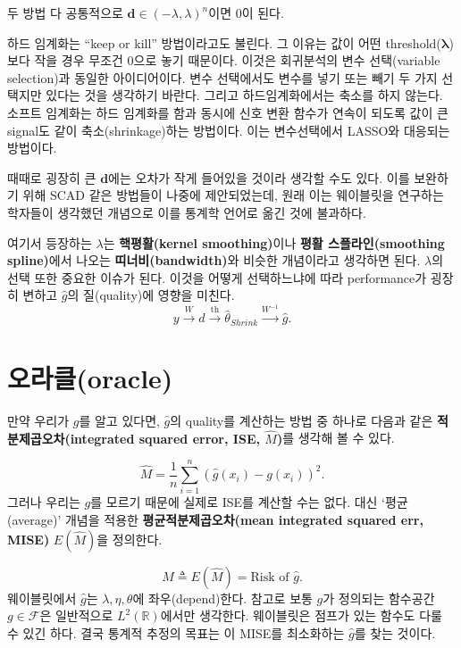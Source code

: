 \documentclass[b5paper,]{scrbook}
\theoremstyle{plain}
\theoremstyle{definition}
\numberwithin{equation}{section}
\begin{document}
두 방법 다 공통적으로 \(\mathbf{d} \in (-\lambda, \lambda)^{n}\)이면 0이 된다.

하드 임계화는 ``keep or kill'' 방법이라고도 불린다. 그 이유는 값이 어떤 threshold(\(\mathbf{\lambda}\))보다 작을 경우 무조건 0으로 놓기 때문이다. 이것은 회귀분석의 변수 선택(variable selection)과 동일한 아이디어이다. 변수 선택에서도 변수를 넣기 또는 빼기 두 가지 선택지만 있다는 것을 생각하기 바란다. 그리고 하드임계화에서는 축소를 하지 않는다. 소프트 임계화는 하드 임계화를 함과 동시에 신호 변환 함수가 연속이 되도록 값이 큰 signal도 같이 축소(shrinkage)하는 방법이다. 이는 변수선택에서 LASSO와 대응되는 방법이다.

때때로 굉장히 큰 \(\mathbf{d}\)에는 오차가 작게 들어있을 것이라 생각할 수도 있다. 이를 보완하기 위해 SCAD 같은 방법들이 나중에 제안되었는데, 원래 이는 웨이블릿을 연구하는 학자들이 생각했던 개념으로 이를 통계학 언어로 옮긴 것에 불과하다.

여기서 등장하는 \(\lambda\)는 \textbf{핵평활(kernel smoothing)}이나 \textbf{평활 스플라인(smoothing spline)}에서 나오는 \textbf{띠너비(bandwidth)}와 비슷한 개념이라고 생각하면 된다. \(\lambda\)의 선택 또한 중요한 이슈가 된다. 이것을 어떻게 선택하느냐에 따라 performance가 굉장히 변하고 \(\hat{g}\)의 질(quality)에 영향을 미친다.
\[y \xrightarrow{W} d \xrightarrow{\text{th}} \hat{\theta}_{Shrink} \xrightarrow{W^{-1}} \hat{g}.\]

\hypertarget{oracle}{%
\section{오라클(oracle)}\label{oracle}}

만약 우리가 \(g\)를 알고 있다면, \(\hat{g}\)의 quality를 계산하는 방법 중 하나로 다음과 같은 \textbf{적분제곱오차(integrated squared error, ISE, \(\hat{M}\))}를 생각해 볼 수 있다.

\[\hat{M}=\frac{1}{n}\sum_{i=1}^{n}(\hat{g}(x_{i})-g(x_{i}))^{2}.\]
그러나 우리는 \(g\)를 모르기 때문에 실제로 ISE를 계산할 수는 없다. 대신 `평균(average)' 개념을 적용한 \textbf{평균적분제곱오차(mean integrated squared err, MISE)} \(E(\hat{M})\)을 정의한다.

\[ M \triangleq E(\hat{M})=\text{Risk of }\hat{g}.\]
웨이블릿에서 \(\hat{g}\)는 \(\lambda, \eta, \theta\)에 좌우(depend)한다. 참고로 보통 \(g\)가 정의되는 함수공간 \(g \in \mathcal{F}\)은 일반적으로 \(L^{2}(\mathbb{R})\)에서만 생각한다. 웨이블릿은 점프가 있는 함수도 다룰 수 있긴 하다. 결국 통계적 추정의 목표는 이 MISE를 최소화하는 \(\hat{g}\)를 찾는 것이다.
\end{document}
